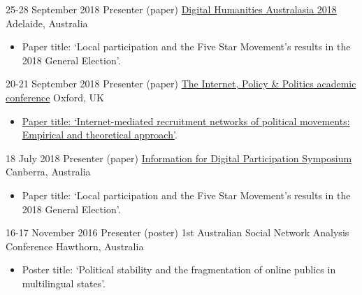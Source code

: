 \documentclass[11pt,a4paper,sans]{moderncv}
\begin{document}
    \cventry
        {25-28 September 2018} %
    {Presenter (paper)} %
    {\href{http://dha-2018.p.dha2018.currinda.com/days/2018-09-28}{Digital Humanities Australasia 2018}} %
    {Adelaide, Australia} %
{}
    {
      \begin{itemize} %
        \item {Paper title: `Local participation and the Five Star Movement’s results in the 2018 General Election'.}
      \end{itemize}
    }


    \cventry
        {20-21 September 2018} %
    {Presenter (paper)} %
    {\href{http://blogs.oii.ox.ac.uk/policy/ipp-conference/papers/}{The Internet, Policy \& Politics academic conference}} %
    {Oxford, UK} %
{}
    {
      \begin{itemize} %
        \item {\href{http://blogs.oii.ox.ac.uk/policy/wp-content/uploads/sites/77/2018/09/IPP2018-Bailo.pdf}{Paper title: `Internet-mediated recruitment networks of political movements: Empirical and theoretical approach'}.}
      \end{itemize}
    }


    \cventry
        {18 July 2018} %
    {Presenter (paper)} %
    {\href{https://www.canberra.edu.au/research/faculty-research-centres/nmrc/news-and-events/events/digital-participation}{Information for Digital Participation Symposium}} %
    {Canberra, Australia} %
{}
    {
      \begin{itemize} %
        \item {Paper title: `Local participation and the Five Star Movement’s results in the 2018 General Election'.}
      \end{itemize}
    }


    \cventry
      {16-17 November 2016} %
    {Presenter (poster)} %
    {1st Australian Social Network Analysis Conference} %
    {Hawthorn, Australia} %
  {}
    {
      \begin{itemize} %
        \item {Poster title: `Political stability and the fragmentation of online publics in multilingual states'.}
      \end{itemize}
    }
\end{document}
